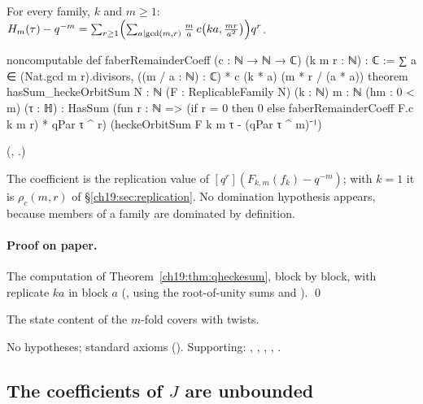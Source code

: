 \begin{theorem}[$q$-expansion of $H_m$]\label{ch19:thm:hecke-exp}
For every family, $k$ and $m\ge1$: $H_m(\tau)-q^{-m}=\sum_{r\ge1}\Bigl(\sum_{a\mid\gcd(m,r)}\frac ma\,c\bigl(ka,\frac{mr}{a^2}\bigr)\Bigr)q^r$.
\end{theorem}
\begin{leancode}
noncomputable def faberRemainderCoeff (c : ℕ → ℕ → ℂ) (k m r : ℕ) : ℂ :=
  ∑ a ∈ (Nat.gcd m r).divisors, ((m / a : ℕ) : ℂ) * c (k * a) (m * r / (a * a))
theorem hasSum_heckeOrbitSum {N : ℕ} (F : ReplicableFamily N) (k : ℕ) {m : ℕ} (hm : 0 < m)
    (τ : ℍ) :
    HasSum (fun r : ℕ => (if r = 0 then 0 else faberRemainderCoeff F.c k m r) * qPar τ ^ r)
      (heckeOrbitSum F k m τ - (qPar τ ^ m)⁻¹)
\end{leancode}
(, .)
\begin{dictionary}
The coefficient  is the replication value of $[q^r](F_{k,m}(f_k)-q^{-m})$; with $k=1$ it is
$\rho_c(m,r)$ of \S\ref{ch19:sec:replication}.  No domination hypothesis appears, because members of a family are
dominated by definition.
\end{dictionary}
\paragraph{Proof on paper.}  The computation of Theorem~\ref{ch19:thm:qheckesum}, block by block, with replicate $ka$ in block
$a$ (, using the root-of-unity sums  and ). \qed
\begin{physics}The state content of the $m$-fold covers with twists.\end{physics}
\begin{status}No hypotheses; standard axioms ().  Supporting:
, , , ,
.\end{status}

\subsection{The coefficients of \texorpdfstring{$J$}{J} are unbounded}

